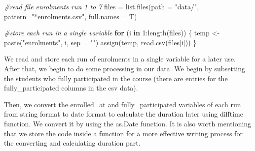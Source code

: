 \documentclass[12pt,]{article}
\newenvironment{Shaded}{\begin{snugshade}}{\end{snugshade}}
\newcommand{\AttributeTok}[1]{\textcolor[rgb]{0.77,0.63,0.00}{#1}}
\newcommand{\CommentTok}[1]{\textcolor[rgb]{0.56,0.35,0.01}{\textit{#1}}}
\newcommand{\ControlFlowTok}[1]{\textcolor[rgb]{0.13,0.29,0.53}{\textbf{#1}}}
\newcommand{\DecValTok}[1]{\textcolor[rgb]{0.00,0.00,0.81}{#1}}
\newcommand{\FunctionTok}[1]{\textcolor[rgb]{0.00,0.00,0.00}{#1}}
\newcommand{\NormalTok}[1]{#1}
\newcommand{\OtherTok}[1]{\textcolor[rgb]{0.56,0.35,0.01}{#1}}
\newcommand{\SpecialCharTok}[1]{\textcolor[rgb]{0.00,0.00,0.00}{#1}}
\newcommand{\StringTok}[1]{\textcolor[rgb]{0.31,0.60,0.02}{#1}}
\begin{document}
\begin{Shaded}
\begin{Highlighting}[]
\CommentTok{\#read file enrolments run 1 to 7}
\NormalTok{files }\OtherTok{=} \FunctionTok{list.files}\NormalTok{(}\AttributeTok{path =} \StringTok{"data/"}\NormalTok{, }
                   \AttributeTok{pattern=}\StringTok{"*enrolments.csv"}\NormalTok{, }\AttributeTok{full.names =}\NormalTok{ T)}

\CommentTok{\#store each run in a single variable}
\ControlFlowTok{for}\NormalTok{ (i }\ControlFlowTok{in} \DecValTok{1}\SpecialCharTok{:}\FunctionTok{length}\NormalTok{(files)) \{}
\NormalTok{  temp }\OtherTok{\textless{}{-}} \FunctionTok{paste}\NormalTok{(}\StringTok{"enrolments"}\NormalTok{, i, }\AttributeTok{sep =} \StringTok{""}\NormalTok{)}
  \FunctionTok{assign}\NormalTok{(temp, }\FunctionTok{read.csv}\NormalTok{(files[i]))}
\NormalTok{\}}
\end{Highlighting}
\end{Shaded}

We read and store each run of enrolments in a single variable for a
later use. After that, we begin to do some processing in our data. We
begin by subsetting the students who fully participated in the course
(there are entries for the fully\_participated columns in the csv data).

\begin{Shaded}
\end{Shaded}

Then, we convert the enrolled\_at and fully\_participated variables of
each run from string format to date format to calculate the duration
later using difftime function. We convert it by using the as.Date
function. It is also worth mentioning that we store the code inside a
function for a more effective writing process for the converting and
calculating duration part.

\begin{Shaded}
\end{Shaded}
\end{document}
